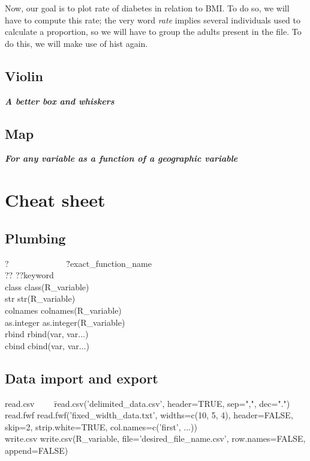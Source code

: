 \documentclass{report}
\newcommand{\code}[1]{\textsf{\ttfamily #1}}
\newcommand{\notefor}[1]{\hfill\textbf{\textit{#1}}}
\begin{document}
	Now, our goal is to plot rate of diabetes in relation to BMI. To do so, we will have to compute this rate; the very word \emph{rate} implies several individuals used to calculate a proportion, so we will have to group the adults present in the file. To do this, we will make use of \code{hist} again.
	
	\section{Violin}
	\notefor{A better box and whiskers}
	
	\section{Map}\label{sec:map}
	\notefor{For any variable as a function of a geographic variable}
	
\chapter{Cheat sheet}

	\section{Plumbing}
\begin{tabbing}
?~~~~~~~~~~~~~ \= ?exact\_function\_name \\
?? \> ??keyword \\
class \> class(R\_variable) \\
str \> str(R\_variable) \\
colnames \> colnames(R\_variable) \\
as.integer \> as.integer(R\_variable) \\
rbind \> rbind(var, var...) \\
cbind \> cbind(var, var...)
\end{tabbing}

	\section{Data import and export}
\begin{tabbing}
read.csv~~~~ \= read.csv('delimited\_data.csv', header=TRUE, sep=",", dec=".") \\
read.fwf \> read.fwf('fixed\_width\_data.txt', widths=c(10, 5, 4), header=FALSE, skip=2, strip.white=TRUE, col.names=c('first', ...)) \\
write.csv \> write.csv(R\_variable, file='desired\_file\_name.csv', row.names=FALSE, append=FALSE)
\end{tabbing}

\printbibliography

\printnoidxglossaries
\end{document}
